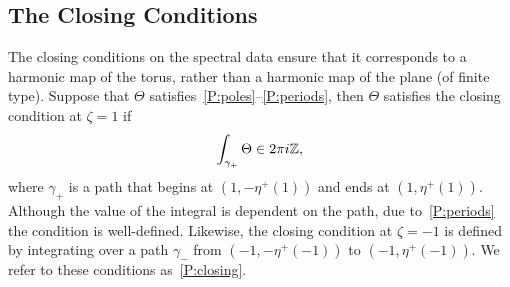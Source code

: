 \documentclass{article}
\begin{document}










\subsection{The Closing Conditions}\label{sub:Closing Conditions}
The closing conditions on the spectral data ensure that it corresponds to a harmonic map of the torus, rather than a harmonic map of the plane (of finite type). Suppose that $\Theta$ satisfies~\ref{P:poles}--\ref{P:periods}, then $\Theta$ satisfies the closing condition at $\zeta=1$ if
\[
\int_{\gamma_{+}} \Theta \in 2\pi i \mathbb{Z},
\]
where $\gamma_+$ is a path that begins at $(1,-\eta^+(1))$ and ends at $(1,\eta^+(1))$. Although the value of the integral is dependent on the path, due to~\ref{P:periods} the condition is well-defined. Likewise, the closing condition at $\zeta=-1$ is defined by integrating over a path $\gamma_-$ from $(-1,-\eta^+(-1))$ to $(-1,\eta^+(-1))$. We refer to these conditions as~\ref{P:closing}.
\end{document}
